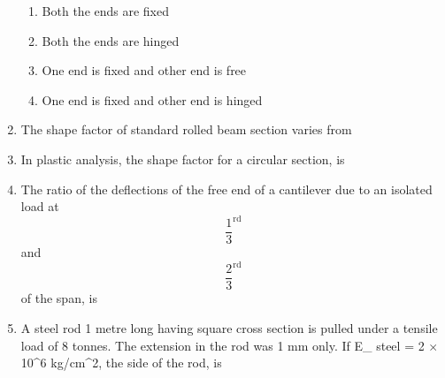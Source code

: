 \documentclass[11pt,a4paper]{article}
\begin{document}
\begin{enumerate}
\begin{enumerate}[label=\Alph*.]
\item{Both the ends are fixed}
\item{Both the ends are hinged}
\item{One end is fixed and other end is free}
\item{One end is fixed and other end is hinged}
\end{enumerate}
\item{The shape factor of standard rolled beam section varies from}
\\
\item{In plastic analysis, the shape factor for a circular section, is}
\\
\item{The ratio of the deflections of the free end of a cantilever due to an isolated load at $${\frac{1}{3}^{{\text{rd}}}}$$ and $${\frac{2}{3}^{{\text{rd}}}}$$ of the span, is}
\\
\item{A steel rod 1 metre long having square cross section is pulled under a tensile load of 8 tonnes. The extension in the rod was 1 mm only. If E\_ steel = 2 $\times$ 10\^{}6 kg/cm\^{}2, the side of the rod, is
}
\\\begin{enumerate*}[itemjoin=\qquad, label=\Alph*.]
\item{1 cm}
\item{1.5 cm}

\end{enumerate*}
\end{enumerate}
\end{document}
